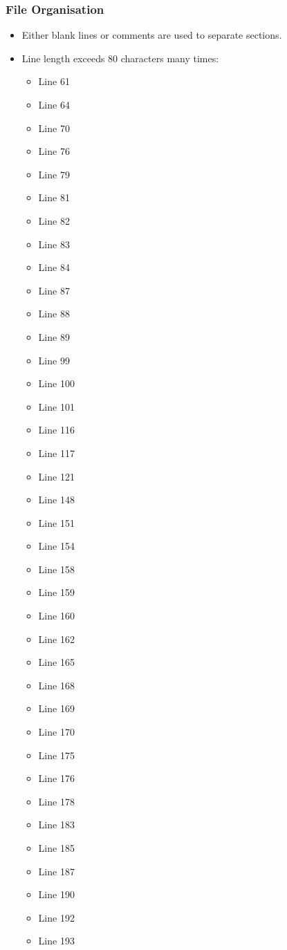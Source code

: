 \subsubsection{File Organisation}
\begin{itemize}
\item Either blank lines or comments are used to separate sections.\\
\item Line length exceeds 80 characters many times:
\begin{itemize}
\item Line 61 
\item Line 64
\item Line 70
\item Line 76
\item Line 79
\item Line 81
\item Line 82
\item Line 83
\item Line 84
\item Line 87
\item Line 88
\item Line 89
\item Line 99
\item Line 100
\item Line 101
\item Line 116
\item Line 117
\item Line 121
\item Line 148
\item Line 151
\item Line 154
\item Line 158
\item Line 159
\item Line 160
\item Line 162
\item Line 165
\item Line 168
\item Line 169
\item Line 170
\item Line 175
\item Line 176
\item Line 178
\item Line 183
\item Line 185
\item Line 187
\item Line 190
\item Line 192
\item Line 193

\end{itemize}
\end{itemize}
